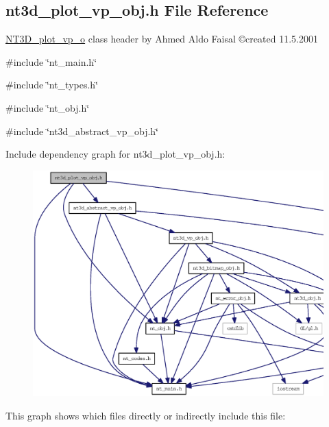 \subsection{nt3d\_\-plot\_\-vp\_\-obj.h File Reference}
\label{nt3d__plot__vp__obj_8h}



\begin{DoxyItemize}
\item \hyperlink{class_n_t3_d__plot__vp__o}{NT3D\_\-plot\_\-vp\_\-o} class header by Ahmed Aldo Faisal \copyright created 11.5.2001 
\end{DoxyItemize} 


{\ttfamily \#include \char`\"{}nt\_\-main.h\char`\"{}}\par
{\ttfamily \#include \char`\"{}nt\_\-types.h\char`\"{}}\par
{\ttfamily \#include \char`\"{}nt\_\-obj.h\char`\"{}}\par
{\ttfamily \#include \char`\"{}nt3d\_\-abstract\_\-vp\_\-obj.h\char`\"{}}\par
Include dependency graph for nt3d\_\-plot\_\-vp\_\-obj.h:
\nopagebreak
\begin{figure}[H]
\begin{center}
\leavevmode
\includegraphics[width=400pt]{nt3d__plot__vp__obj_8h__incl}
\end{center}
\end{figure}
This graph shows which files directly or indirectly include this file:
\nopagebreak
